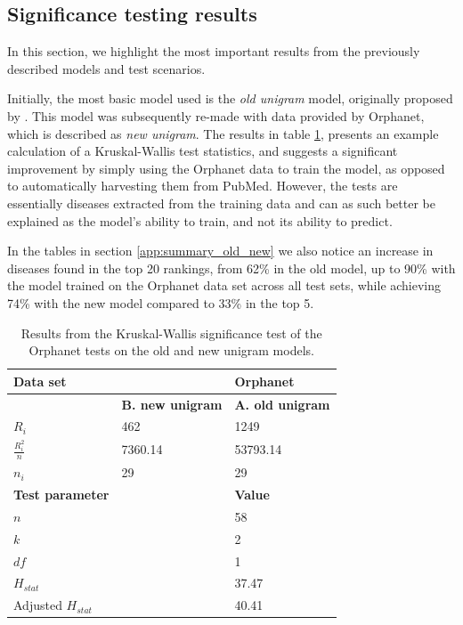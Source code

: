\documentclass[10pt,letterpaper,two column,final]{article}
\begin{document}
\subsection{Significance testing results}
In this section, we highlight the most important results from the
previously described models and test scenarios.

Initially, the most basic model used is the \textit{old unigram} model,
originally proposed by \cite{jensenandersen}. This model was
subsequently re-made with data provided by Orphanet, which is described
as \textit{new unigram}. The results in table \ref{tab:orpha_old_new_stat},
presents an example calculation of a Kruskal-Wallis test statistics,
and suggests a significant improvement by simply using the Orphanet data
to train the model, as opposed to automatically harvesting them from
PubMed. However, the tests are essentially diseases extracted from the
training data and can as such better be explained as the model's ability
to train, and not its ability to predict.

In the tables in section \ref{app:summary_old_new} we also notice an
increase in diseases found in the top 20 rankings, from 62\% in the old
model, up to 90\% with the model trained on the Orphanet data set across
all test sets, while achieving 74\% with the new model compared to 33\%
in the top 5.

\begin{table}[here]
\begin{center}
\begin{tabular}{p{2.5cm}p{2.1cm}p{2.1cm}}
    \textbf{Data set} & & \textbf{Orphanet} \\ \hline\hline
 &	\textbf{B. new unigram} &	\textbf{A. old unigram} \\ \hline
$R_{i}$ &	462 &	1249 \\
$\frac{R_{i}^2}{n}$ &	7360.14	& 53793.14 \\
$n_{i}$	& 29	& 29 \\ \hline \hline
\textbf{Test parameter}	&	&\textbf{Value} \\ \hline
$n$	 &  &  58 \\
$k$  &  &  2 \\
$df$ &  &  1 \\ \hline \hline
$H_{stat}$  &  &  37.47 \\
Adjusted $H_{stat}$ & &  40.41 \\
\end{tabular}
    \caption{Results from the Kruskal-Wallis significance test of the Orphanet tests on the old and new unigram models.}
    \label{tab:orpha_old_new_stat}
\end{center}
\end{table}
\end{document}
